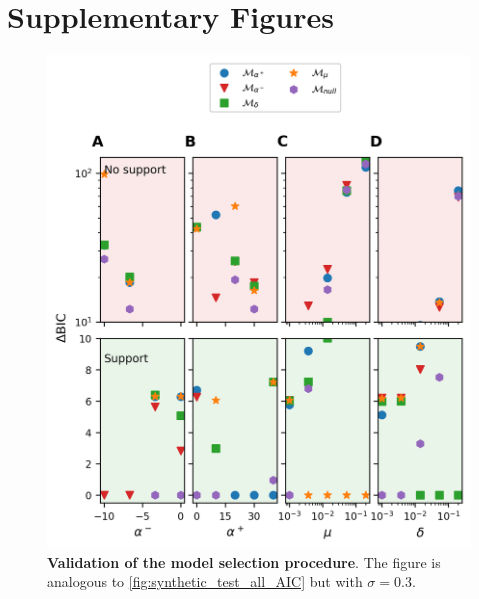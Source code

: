 
\graphicspath{{./content/chap4_econobiology/}}

\setcounter{equation}{0}
\setcounter{figure}{0}
\setcounter{table}{0}
\makeatletter %
\renewcommand{\thetable}{S\arabic{table}}
\renewcommand{\theequation}{S\arabic{equation}}
\renewcommand{\thefigure}{S\arabic{figure}}
\makeatother %

\section{Supplementary Figures}
\FloatBarrier


\begin{figure}
  \center
  \includegraphics{figures/SI/synthetic_test_all_AIC_r=0.3.png}
  \caption{\small \textbf{Validation of the model selection procedure}. The figure is analogous to \cref{fig:synthetic_test_all_AIC} but with $\sigma = 0.3$. 
   }\label{figSI:synthetic_test_all_AIC}
\end{figure}

